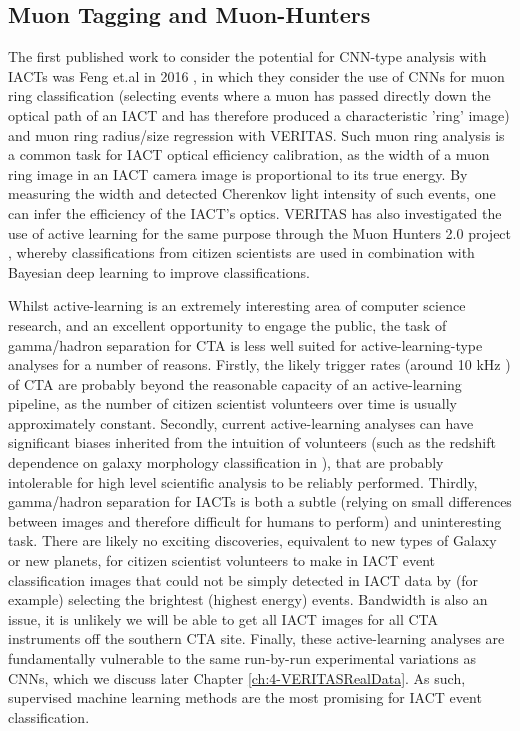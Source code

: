 \subsection{Muon Tagging and Muon-Hunters}
The first published work to consider the potential for CNN-type analysis with IACTs was Feng et.al in 2016 \cite{feng2016}, in which they consider the use of CNNs for muon ring classification (selecting events where a muon has passed directly down the optical path of an IACT and has therefore produced a characteristic 'ring' image) and muon ring radius/size regression with VERITAS. Such muon ring analysis is a common task for IACT optical efficiency calibration, as the width of a muon ring image in an IACT camera image is proportional to its true energy. By measuring the width and detected Cherenkov light intensity of such events, one can infer the efficiency of the IACT's optics. VERITAS has also investigated the use of active learning for the same purpose through the Muon Hunters 2.0 project \cite{muonhunters2}, whereby classifications from citizen scientists are used in combination with Bayesian deep learning to improve classifications.

Whilst active-learning is an extremely interesting area of computer science research, and an excellent opportunity to engage the public, the task of gamma/hadron separation for CTA is less well suited for active-learning-type analyses for a number of reasons. Firstly, the likely trigger rates (around 10 kHz \cite{trigrate}) of CTA are probably beyond the reasonable capacity of an active-learning pipeline, as the number of citizen scientist volunteers over time is usually approximately constant. Secondly, current active-learning analyses can have significant biases inherited from the intuition of volunteers (such as the redshift dependence on galaxy morphology classification in \cite{mike}), that are probably intolerable for high level scientific analysis to be reliably performed. Thirdly, gamma/hadron separation for IACTs is both a subtle (relying on small differences between images and therefore difficult for humans to perform) and uninteresting task. There are likely no exciting discoveries, equivalent to new types of Galaxy or new planets, for citizen scientist volunteers to make in IACT event classification images that could not be simply detected in IACT data by (for example) selecting the brightest (highest energy) events. Bandwidth is also an issue, it is unlikely we will be able to get all IACT images for all CTA instruments off the southern CTA site. Finally, these active-learning analyses are fundamentally vulnerable to the same run-by-run experimental variations as CNNs, which we discuss later Chapter \ref{ch:4-VERITASRealData}. As such, supervised machine learning methods are the most promising for IACT event classification.

